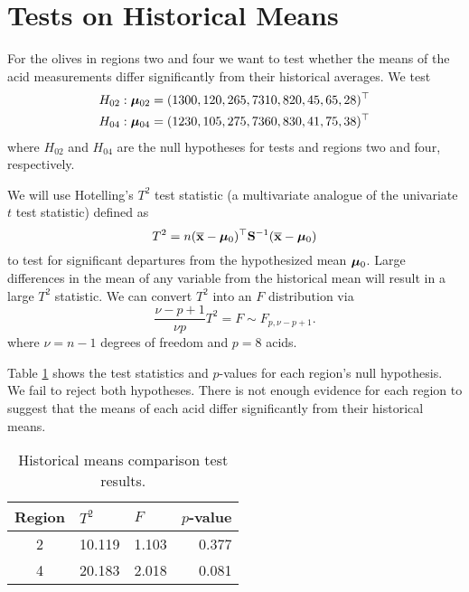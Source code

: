 \section{Tests on Historical Means}

For the olives in regions two and four we want to test whether the means of the acid measurements differ significantly from their historical averages. We test 
\begin{eqnarray*}
H_{02}:\mathbf{\bm{\mu}}_{02}=(1300,120,265,7310,820,45,65,28)^\top \\
H_{04}:\mathbf{\bm{\mu}}_{04}=(1230,105,275,7360,830,41,75,38)^\top
\end{eqnarray*}
where $H_{02}$ and $H_{04}$ are the null hypotheses for tests and regions two and four, respectively.

We will use Hotelling's $T^2$ test statistic (a multivariate analogue of the univariate $t$ test statistic) defined as
\[ T^2 = n(\overline{\mathbf{\bm{x}}}-\mathbf{\bm{\mu}}_0)^\top\mathbf{\bm{S}}^{-1}(\overline{\mathbf{\bm{x}}}-\mathbf{\bm{\mu}}_0) \]
to test for significant departures from the hypothesized mean $\mathbf{\bm{\mu}}_0$. Large differences in the mean of any variable from the historical mean will result in a large $T^2$ statistic. We can convert $T^2$ into an $F$ distribution via
\[ \frac{\nu -p+1}{\nu p}T^2 = F \sim F_{p,\nu-p+1}. \]
where $\nu=n-1$ degrees of freedom and $p=8$ acids.

Table \ref{history} shows the test statistics and $p$-values for each region's null hypothesis. We fail to reject both hypotheses. There is not enough evidence for each region to suggest that the means of each acid differ significantly from their historical means.

\begin{table}
\begin{center}
\begin{tabular}{c | rrr}
Region & \multicolumn{1}{l}{$T^2$}  & \multicolumn{1}{l}{$F$}    & \multicolumn{1}{l}{$p$-value} \\ \hline \hline
     2 & 10.119 & 1.103  & 0.377     \\
     4 & 20.183 & 2.018  & 0.081     \\
\end{tabular}
\caption{Historical means comparison test results.}
\label{history}
\end{center}
\end{table}
